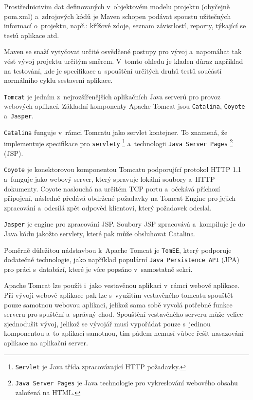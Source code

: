 \documentclass[twoside, 12pt]{article}
\begin{document}
{%
Prostřednictvím dat definovaných v~objektovém modelu projektu (obyčejně pom.xml)
a~zdrojových kódů je Maven schopen podávat spoustu užitečných informací o~projektu,
např.: křížové zdoje, seznam závistlostí, reporty, týkající se testů aplikace atd.

Maven se snaží vytyčovat určité osvědčené postupy pro vývoj
a~napomáhat tak vést vývoj projektu určitým směrem.
V~tomto ohledu je kladen důraz například na testování,
kde je specifikace a~spouštění určitých druhů testů
součástí normálního cyklu sestavení aplikace.
\cite{maven}


\texttt{Tomcat} je jedním z~nejrozšířenějších
aplikačních Java serverů pro provoz webových aplikací.
Základní komponenty Apache Tomcat jsou \texttt{Catalina}, \texttt{Coyote} a~\texttt{Jasper}.

\texttt{Catalina} funguje v~rámci Tomcatu jako servlet kontejner.
To znamená, že implementuje specifikace pro \texttt{servlety}
\footnote{\texttt{Servlet} je Java třída zpracovávající HTTP požadavky.}
a~technologii \texttt{Java Server Pages}
\footnote{\texttt{Java Server Pages} je Java technologie pro vykreslování webového obsahu založená na HTML.} (JSP).

\texttt{Coyote} je konektorovou komponentou Tomcatu podporující protokol HTTP 1.1
a~funguje jako webový server, který spravuje lokální soubory a~HTTP dokumenty.
Coyote naslouchá na určitém TCP portu a~očekává příchozí připojení,
následně předává obdržené požadavky na Tomcat Engine pro jejich zpracování
a~odesílá zpět odpověd klientovi, který požadavek odeslal.

\texttt{Jasper} je engine pro zpracování JSP.
Soubory JSP zpracovává a~kompiluje je do Java kódu jakožto servlety,
které pak může obsluhovat Catalina.
\cite{tomcatWikipedia}

Poměrně důležitou nádstavbou k~Apache Tomcat je \texttt{TomEE},
který podporuje dodatečné technologie,
jako například populární \texttt{Java Persistence API} (JPA) pro práci s~databází,
které je více popsáno v~samostatně sekci.

Apache Tomcat lze použít i~jako vestavěnou aplikaci v~rámci webové aplikace.
Při vývoji webové aplikace pak lze s~využitím vestavěného tomcatu
spouštět pouze samotnou webovou aplikaci, jelikož sama sobě vyvolá
potřebné funkce serveru pro spuštění a~správný chod.
Spouštění vestavěného serveru může velice zjednodušit vývoj,
jelikož se vývojář musí vypořádat pouze s~jedinou komponentou a~to aplikací samotnou,
tím pádem nemusí vůbec řešit nasazování aplikace na aplikační server.
\cite{javaWorld}

}
\end{document}
